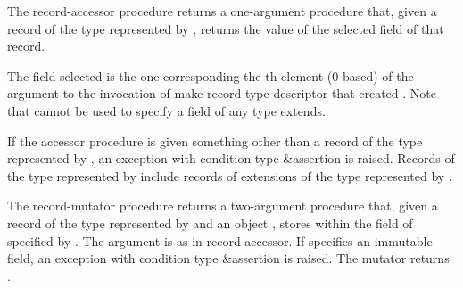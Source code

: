 \begin{entry}{%
}

The {\cf record-accessor} procedure returns a one-argument procedure that, given a
record of the type represented by , returns the value of the
selected field of that record.

The field selected is the one corresponding the th element
(0-based) of the  argument to the invocation of {\cf
  make-record-type-descriptor} that created . Note that
 cannot be used to specify a field of any type  extends.

If the accessor procedure is given something other than
a record of the type represented by , an exception with
condition type {\cf\&assertion} is raised.  Records
of the type represented by  include records of extensions of
the type represented by .
\end{entry}

\begin{entry}{%
}
   
The {\cf record-mutator} procedure returns a two-argument procedure that, given a
record  of the type represented by  and an object
, stores  within the field of  specified by
. The  argument is as in {\cf record-accessor}. If
 specifies an immutable field, an exception with condition type
{\cf\&assertion} is raised.
The mutator returns \unspecifiedreturn.
\end{entry}

